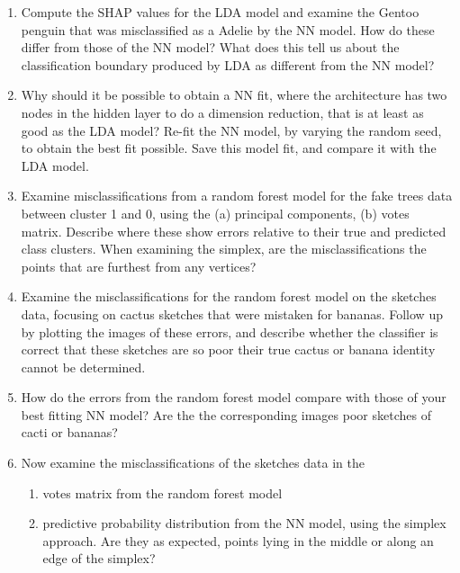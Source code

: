 \documentclass[
  letterpaper,
]{krantz}
\providecommand{\tightlist}{%
  \setlength{\itemsep}{0pt}\setlength{\parskip}{0pt}}
\begin{document}
\begin{enumerate}
\def\labelenumi{\arabic{enumi}.}
\item
  Compute the SHAP values for the LDA model and examine the Gentoo
  penguin that was misclassified as a Adelie by the NN model. How do
  these differ from those of the NN model? What does this tell us about
  the classification boundary produced by LDA as different from the NN
  model?
\item
  Why should it be possible to obtain a NN fit, where the architecture
  has two nodes in the hidden layer to do a dimension reduction, that is
  at least as good as the LDA model? Re-fit the NN model, by varying the
  random seed, to obtain the best fit possible. Save this model fit, and
  compare it with the LDA model.
\item
  Examine misclassifications from a random forest model for the fake
  trees data between cluster 1 and 0, using the (a) principal
  components, (b) votes matrix. Describe where these show errors
  relative to their true and predicted class clusters. When examining
  the simplex, are the misclassifications the points that are furthest
  from any vertices?
\item
  Examine the misclassifications for the random forest model on the
  sketches data, focusing on cactus sketches that were mistaken for
  bananas. Follow up by plotting the images of these errors, and
  describe whether the classifier is correct that these sketches are so
  poor their true cactus or banana identity cannot be determined.
\item
  How do the errors from the random forest model compare with those of
  your best fitting NN model? Are the the corresponding images poor
  sketches of cacti or bananas?
\item
  Now examine the misclassifications of the sketches data in the

  \begin{enumerate}
  \def\labelenumii{\alph{enumii}.}
  \tightlist
  \item
    votes matrix from the random forest model
  \item
    predictive probability distribution from the NN model, using the
    simplex approach. Are they as expected, points lying in the middle
    or along an edge of the simplex?
  \end{enumerate}
\end{enumerate}

\end{document}
